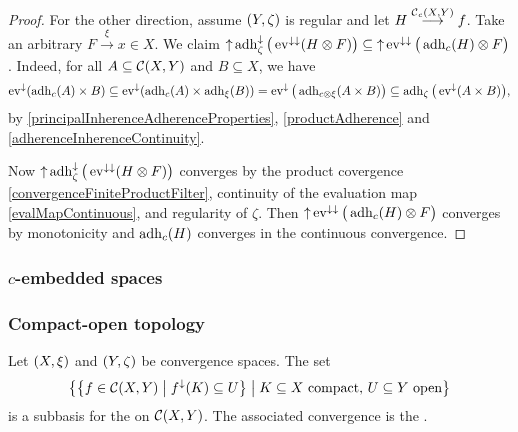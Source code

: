 \begin{proof}
For the other direction, assume $\sSet{Y,\zeta}$ is regular and let $H \overset{\operatorname{\mathcal{C}}_c(X,Y)}{\longrightarrow} f$.
Take an arbitrary $F\overset{\xi}{\longrightarrow} x\in X$. We claim $\operatorname{\uparrow}\operatorname{adh}_\zeta^{\downarrow}\big(\operatorname{ev}^{\downarrow\downarrow}(H\otimes F)\big)\subseteq \operatorname{\uparrow} \operatorname{ev}^{\downarrow\downarrow}\big(\operatorname{adh}_c(H)\otimes F\big)$. Indeed, for all $A\subseteq \operatorname{\mathcal{C}}(X,Y)$ and $B\subseteq X$, we have
\[ \operatorname{ev}^{\downarrow}(\operatorname{adh}_{c}(A)\times B) \subseteq \operatorname{ev}^{\downarrow}(\operatorname{adh}_{c}(A)\times \operatorname{adh}_\xi(B)) = \operatorname{ev}^{\downarrow}\big(\operatorname{adh}_{c\otimes \xi}(A\times B)\big) \subseteq \operatorname{adh}_{\zeta}\big(\operatorname{ev}^\downarrow(A\times B)\big), \]
by \ref{principalInherenceAdherenceProperties}, \ref{productAdherence} and \ref{adherenceInherenceContinuity}.

Now $\operatorname{\uparrow}\operatorname{adh}_\zeta^{\downarrow}\big(\operatorname{ev}^{\downarrow\downarrow}(H\otimes F)\big)$ converges by the product covergence \ref{convergenceFiniteProductFilter}, continuity of the evaluation map \ref{evalMapContinuous}, and regularity of $\zeta$. Then $\operatorname{\uparrow} \operatorname{ev}^{\downarrow\downarrow}\big(\operatorname{adh}_c(H)\otimes F\big)$ converges by monotonicity and $\operatorname{adh}_c(H)$ converges in the continuous convergence.
\end{proof}

\subsubsection{$c$-embedded spaces}

\subsubsection{Compact-open topology}
\begin{definition}
Let $\sSet{X,\xi}$ and $\sSet{Y,\zeta}$ be convergence spaces. The set
\[ \setbuilder{\big.\setbuilder{f\in \cont(X,Y)}{f^\imf(K)\subseteq U}}{\text{$K\subseteq X$ compact, $U\subseteq Y$ open}} \]
is a subbasis for the  on $\operatorname{\mathcal{C}}(X,Y)$. The associated convergence is the .
\end{definition}

